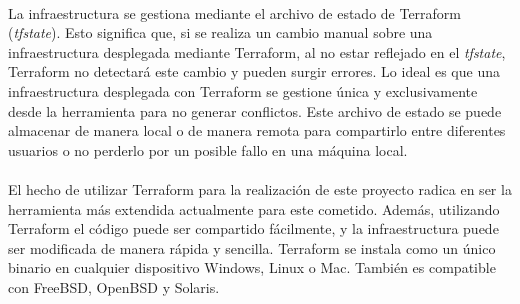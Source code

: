 \documentclass[../../memoria.tex]{subfiles}
\begin{document}
\paragraph{}
La infraestructura se gestiona mediante el archivo de estado de Terraform (\textit{tfstate}). Esto significa que, si se realiza un cambio manual sobre una infraestructura desplegada mediante Terraform, al no estar reflejado en el \textit{tfstate}, Terraform no detectará este cambio y pueden surgir errores. Lo ideal es que una infraestructura desplegada con Terraform se gestione única y exclusivamente desde la herramienta para no generar conflictos. Este archivo de estado se puede almacenar de manera local o de manera remota para compartirlo entre diferentes usuarios o no perderlo por un posible fallo en una máquina local.

\paragraph{}
El hecho de utilizar Terraform para la realización de este proyecto radica en ser la herramienta más extendida actualmente para este cometido. Además, utilizando Terraform el código puede ser compartido fácilmente, y la infraestructura puede ser modificada de manera rápida y sencilla. Terraform se instala como un único binario en cualquier dispositivo Windows, Linux o Mac. También es compatible con FreeBSD, OpenBSD y Solaris.
\end{document}
